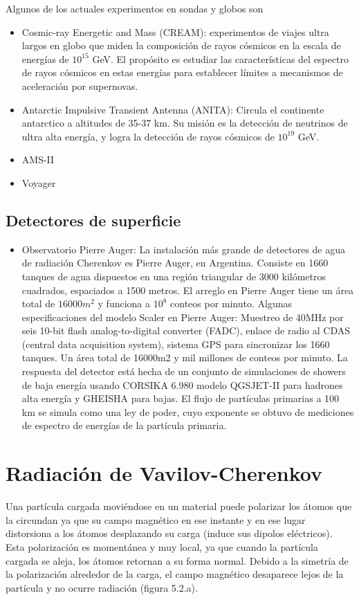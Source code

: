 \documentclass{book}
\begin{document}
Algunos de los actuales experimentos en sondas y globos son
\begin{itemize}
\item Cosmic-ray Energetic and Mass (CREAM): experimentos de viajes ultra largos en globo que miden la composici\'on de rayos c\'osmicos en la escala de energ\'ias de $10^15$ GeV. El prop\'osito es estudiar las caracter\'isticas del espectro de rayos c\'osmicos en estas energ\'ias para establecer l\'imites a mecanismos de aceleraci\'on por supernovas. \citep{SEO}
\item Antarctic Impulsive Transient Antenna (ANITA): Circula el continente antarctico a altitudes de 35-37 km. Su misi\'on es la detecci\'on de neutrinos de ultra alta energ\'ia, y logra la detecci\'on de rayos c\'osmicos de $10^19$ GeV. \citep{HOOVER}
\item AMS-II
\item Voyager
\end{itemize}

\subsection{Detectores de superficie}

\begin{itemize}
\item Observatorio Pierre Auger: La instalaci\'on m\'as grande de detectores de agua de radiaci\'on Cherenkov es Pierre Auger, en Argentina. Consiste en 1660 tanques de agua dispuestos en una regi\'on triangular de 3000 kil\'ometros cuadrados, espaciados a 1500 metros. El arreglo en Pierre Auger tiene un \'area total de $16000m^{2}$ y funciona a $10^8$ conteos por minuto. Algunas especificaciones del modelo Scaler en Pierre Auger: Muestreo de 40MHz por seis 10-bit flash analog-to-digital converter (FADC), enlace de radio al CDAS (central data acquisition system), sistema GPS para sincronizar los 1660 tanques. Un \'area total de 16000m2 y mil millones de conteos por minuto. La respuesta del detector est\'a hecha de un conjunto de simulaciones de showers de baja energ\'ia usando CORSIKA 6.980 modelo QGSJET-II para hadrones alta energ\'ia y GHEISHA para bajas. El flujo de part\'iculas primarias a 100 km se simula como una ley de poder, cuyo exponente se obtuvo de mediciones de espectro de energ\'ias de la part\'icula primaria. \citep{VILLASENOR}
\end{itemize}

\section{Radiaci\'on de Vavilov-Cherenkov}
Una part\'icula cargada movi\'endose en un material puede polarizar los \'atomos que la circundan ya que su campo magn\'etico en ese instante y en ese lugar distorsiona a los \'atomos desplazando su carga (induce sus dipolos el\'ectricos). Esta polarizaci\'on es moment\'anea y muy local, ya que cuando la part\'icula cargada se aleja, los \'atomos retornan a su forma normal. Debido a la simetr\'ia de la polarizaci\'on alrededor de la carga, el campo magn\'etico desaparece lejos de la part\'icula y no ocurre radiaci\'on (figura 5.2.a). \citep{PEREZ}
\end{document}
